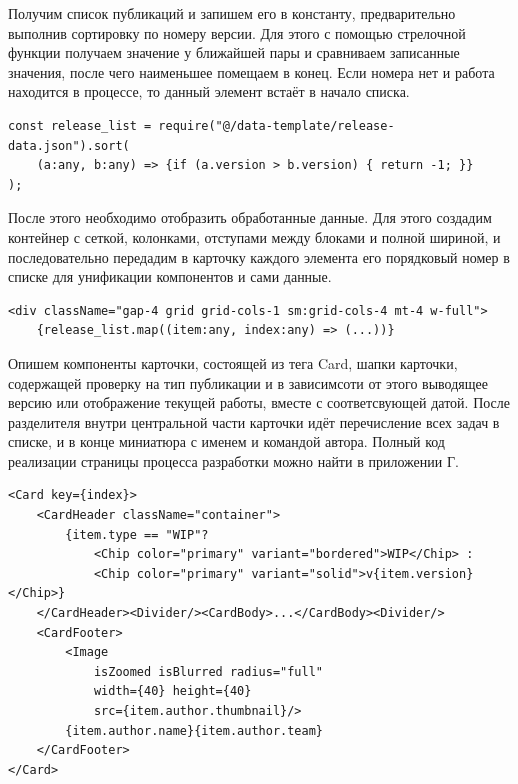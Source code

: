 \documentclass[master, och, diploma]{SCWorks}
\begin{document}
Получим список публикаций и запишем его в константу, предварительно выполнив сортировку по номеру версии. Для этого с помощью стрелочной функции получаем значение у ближайшей пары и сравниваем записанные значения, после чего наименьшее помещаем в конец. Если номера нет и работа находится в процессе, то данный элемент встаёт в начало списка.
\begin{verbatim}
const release_list = require("@/data-template/release-data.json").sort(
    (a:any, b:any) => {if (a.version > b.version) { return -1; }}
);
\end{verbatim}

После этого необходимо отобразить обработанные данные. Для этого создадим контейнер с сеткой, колонками, отступами между блоками и полной шириной, и последовательно передадим в карточку каждого элемента его порядковый номер в списке для унификации компонентов и сами данные.
\begin{verbatim}
<div className="gap-4 grid grid-cols-1 sm:grid-cols-4 mt-4 w-full">
    {release_list.map((item:any, index:any) => (...))}
\end{verbatim}

Опишем компоненты карточки, состоящей из тега Card, шапки карточки, содержащей проверку на тип публикации и в зависимсоти от этого выводящее версию или отображение текущей работы, вместе с соответсвующей датой. После разделителя внутри центральной части карточки идёт перечисление всех задач в списке, и в конце миниатюра с именем и командой автора. Полный код реализации страницы процесса разработки можно найти в приложении Г.
\begin{verbatim}
<Card key={index}>
    <CardHeader className="container">
        {item.type == "WIP"?
            <Chip color="primary" variant="bordered">WIP</Chip> : 
            <Chip color="primary" variant="solid">v{item.version}</Chip>}
    </CardHeader><Divider/><CardBody>...</CardBody><Divider/>
    <CardFooter>
        <Image
            isZoomed isBlurred radius="full"
            width={40} height={40}
            src={item.author.thumbnail}/>
        {item.author.name}{item.author.team}
    </CardFooter>
</Card>
\end{verbatim}
\end{document}
